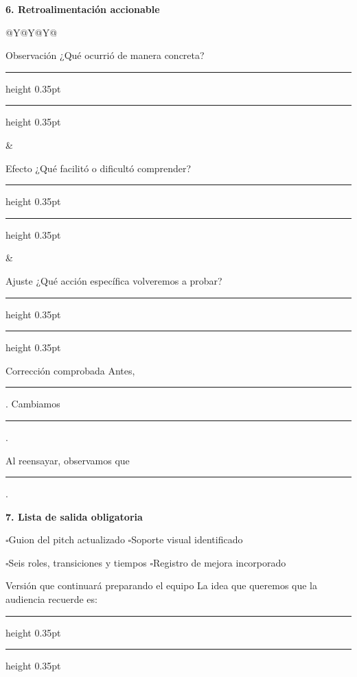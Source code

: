 \documentclass[10pt,a4paper]{article}
\newcommand{\writearea}[1]{\vspace{#1}\hrule height 0.35pt\vspace{4mm}\hrule height 0.35pt}
\newcommand{\checkline}[1]{$\square$\hspace{1.5mm}#1}
\begin{document}
{\large\bfseries\color{AIEPNavy}6. Retroalimentación accionable}\par
\begin{tabularx}{\textwidth}{@{}Y@{\hspace{3mm}}Y@{\hspace{3mm}}Y@{}}
\begin{fieldbox}[height=41mm]{Observación}
¿Qué ocurrió de manera concreta?
\writearea{8mm}
\end{fieldbox}
&
\begin{fieldbox}[height=41mm]{Efecto}
¿Qué facilitó o dificultó comprender?
\writearea{8mm}
\end{fieldbox}
&
\begin{fieldbox}[height=41mm]{Ajuste}
¿Qué acción específica volveremos a probar?
\writearea{8mm}
\end{fieldbox}
\end{tabularx}

\begin{accentfield}[height=38mm]{Corrección comprobada}
Antes, \rule{55mm}{0.35pt}. Cambiamos \rule{68mm}{0.35pt}.\par
Al reensayar, observamos que \rule{99mm}{0.35pt}.
\end{accentfield}

{\large\bfseries\color{AIEPNavy}7. Lista de salida obligatoria}\par
\begin{tcolorbox}[colback=AIEPNavy,colframe=AIEPNavy,coltext=white,boxrule=0pt,arc=1mm,left=3mm,right=3mm,top=2.5mm,bottom=2.5mm]
\checkline{Guion del pitch actualizado}\hspace{5mm}
\checkline{Soporte visual identificado}\par
\checkline{Seis roles, transiciones y tiempos}\hspace{5mm}
\checkline{Registro de mejora incorporado}
\end{tcolorbox}

\begin{fieldbox}[height=32mm]{Versión que continuará preparando el equipo}
La idea que queremos que la audiencia recuerde es:
\writearea{5mm}
\end{fieldbox}
\end{document}
